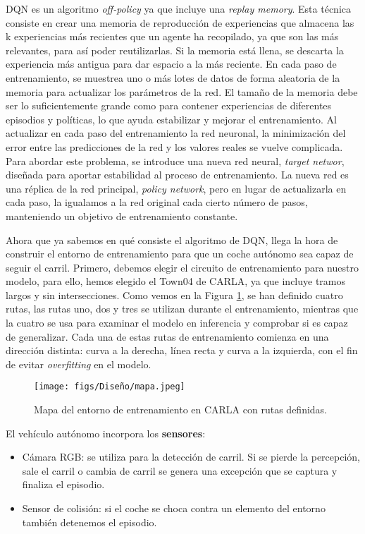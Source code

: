 \ac{DQN} es un algoritmo \textit{off-policy} ya que incluye una \textit{replay memory}. Esta técnica consiste en crear una memoria de reproducción de experiencias que almacena las k experiencias más recientes que un agente ha recopilado, ya que son las más relevantes, para así poder reutilizarlas. Si la memoria está llena, se descarta la experiencia más antigua para dar espacio a la más reciente. En cada paso de entrenamiento, se muestrea uno o más lotes de datos de forma aleatoria de la memoria para actualizar los parámetros de la red. El tamaño de la memoria debe ser lo suficientemente grande como para contener experiencias de diferentes episodios y políticas, lo que ayuda estabilizar y mejorar el entrenamiento. Al actualizar en cada paso del entrenamiento la red neuronal, la minimización del error entre las predicciones de la red y los valores reales se vuelve complicada. Para abordar este problema, se introduce una nueva red neural, \textit{target networ}, diseñada para aportar estabilidad al proceso de entrenamiento. La nueva red es una réplica de la red principal, \textit{policy network}, pero en lugar de actualizarla en cada paso, la igualamos a la red original cada cierto número de pasos, manteniendo un objetivo de entrenamiento constante.

Ahora que ya sabemos en qué consiste el algoritmo de \ac{DQN}, llega la hora de construir el entorno de entrenamiento para que un coche autónomo sea capaz de seguir el carril. Primero, debemos elegir el circuito de entrenamiento para nuestro modelo, para ello, hemos elegido el Town04 de CARLA, ya que incluye tramos largos y sin intersecciones. Como vemos en la Figura \ref{fig:mapa}, se han definido cuatro rutas, las rutas uno, dos y tres se utilizan durante el entrenamiento, mientras que la cuatro se usa para examinar el modelo en inferencia y comprobar si es capaz de generalizar. Cada una de estas rutas de entrenamiento comienza en una dirección distinta: curva a la derecha, línea recta y curva a la izquierda, con el fin de evitar \textit{overfitting} en el modelo.

\begin{figure}[ht]
  \centering
  \texttt{[image: figs/Diseño/mapa.jpeg]}
  \caption{Mapa del entorno de entrenamiento en CARLA con rutas definidas.}
  \label{fig:mapa}
\end{figure}

El vehículo autónomo incorpora los \textbf{sensores}:
\begin{itemize}
		\item Cámara RGB: se utiliza para la detección de carril. Si se pierde la percepción, sale el carril o cambia de carril se genera una excepción que se captura y finaliza el episodio.
		\item Sensor de colisión: si el coche se choca contra un elemento del entorno también detenemos el episodio.
\end{itemize}

